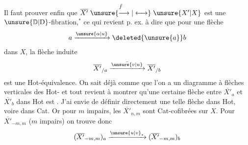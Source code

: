 Il faut prouver enfin que $\overline{X'}\mathrel{\overset{\bar f}{\unsure{\longrightarrow|\longleftrightarrow}}}\unsure{X'|X}$ est une $\unsure{\mathbb D|\mathrm D}$-fibration,$^{*}$ ce qui revient p. ex. à dire que pour une flèche
\[
a\xrightarrow{\unsure{\alpha|u}}\deleted{\unsure{a}}b
\]
dans $X$, la flèche induite
\[
\overline{X'}_{/a}\xrightarrow{\bar{\unsure{v|u}}}\overline{X'}_{/b}
\]
est une Hot-équivalence. On sait déjà comme  que l'on a un diagramme à flèches verticales des Hot-
et tout revient à montrer qu'une certaine flèche entre $\overline{X'}_a$ et $\overline{X'}_b$ dans Hot est .  J'ai envie de définir directement une telle flèche dans Hot, voire dans Cat. Or pour  $m$  impairs, les $\overline{X'}_{n,m}$ sont Cat-cofibrées sur $X$. Pour $\overline{X'}_{-m,m}$ ($m$ impairs) on trouve donc
\[
(\overline{X'}_{-m,m})_a\xrightarrow{\unsure{u|v}_*}(\overline{X'}_{-m,m})_b
\]
